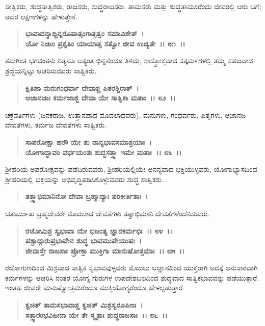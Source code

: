 ಸಾತ್ವಿಕರು, ಶುದ್ಧಸಾತ್ವಿಕರು, ರಾಜಸರು, ಶುದ್ಧರಾಜಸರು, ತಾಮಸರು ಮತ್ತು ಶುದ್ಧತಾಮಸರೆಂದು ಜೀವರಲ್ಲಿ ಆರು ಬಗೆ; ಅವರ ಲಕ್ಷಣಗಳನ್ನು ಹೇಳುತ್ತೇನೆ.

\begin{verse}
\textbf{ಭಾವಾದನ್ಯಾದ್ಭಿನ್ನರೂಪಾತ್ಸಂಗಾತ್ಸತ್ವಂ ಸಮಾವಿಶೇತ್~।}\\\textbf{ಯೋ ನಿಜಾಂ ಪ್ರಕೃತಿಂ ಯಾಯಾತ್ಸ ಸತ್ವೋ ಜೀವ ಉಚ್ಯತೇ~।। ೮೧~।।}
\end{verse}

ತಮಗಿಂತ ಭಗವಂತನು ನಿತ್ಯನೂ ಅತ್ಯಂತ ಭಿನ್ನನೆಂದೂ ತಿಳಿದು, ಶಾಸ್ತ್ರೋಕ್ತವಾದ ಸತ್ಕರ್ಮಗಳಲ್ಲಿ ತಮ್ಮ ಸಹಜವಾದ ಶ್ರದ್ಧೆಯನ್ನಿಟ್ಟು ಆಚರಿಸುವವರು ಸಾತ್ವಿಕರು.

\begin{verse}
\textbf{ಕ್ಷಿತಿಪಾ ಮನುಗಂಧರ್ವಾ ದೇವಾಶ್ಚ ಪಿತರಶ್ಚಿರಾತ್~।}\\\textbf{ಆಜಾನಜಾಃ ಕರ್ಮಜಾಶ್ಚ ದೇವಾ ಯೇ ಸಾತ್ವಿಕಾ ಮತಾಃ~।। ೮೨~।।}
\end{verse}

ಚಕ್ರವರ್ತಿಗಳು (ಜನಕರಾಜ, ಉತ್ತಾನಪಾದ ಮೊದಲಾದವರು), ಮನುಗಳು, ಗಂಧ\-ರ್ವರು, ಪಿತೃಗಳು, ಆಜಾನಜ ದೇವತೆಗಳು, ಕರ್ಮಜ ದೇವತೆಗಳು ಸಾತ್ವಿಕರು.

\begin{verse}
\textbf{ಸಾಪರೋಕ್ಷಾ ಹ‌ರೌ ಯೇ ತು ನಾನ್ಯಭಾವಸಮಾಶ್ರಯಾಃ~।}\\\textbf{ಯೋಗಾದ್ಭಾವಂ ವರ್ಧಯಂತಃ ಶುದ್ಧಸತ್ತ್ವಾ ಇಮೇ ಮತಾಃ~।। ೮೩~।।}
\end{verse}

ಶ‍್ರೀಹರಿಯ ಅಪರೋಕ್ಷವನ್ನು ಪಡೆದಿರುವವರು, ಶ‍್ರೀಹರಿಯಲ್ಲಿಯೇ ಅನನ್ಯವಾದ ಭಕ್ತಿಯುಳ್ಳವರು, ಯೋಗಾಭ್ಯಾಸದಿಂದ ಶ‍್ರೀಹರಿಯಲ್ಲಿ ಭಕ್ತಿಯನ್ನು ಅಭಿವೃದ್ಧಿಪಡಿಸಿಕೊಳ್ಳುವವರು ಶುದ್ಧ ಸಾತ್ವಿಕರು.

\begin{verse}
\textbf{ತತ್ತ್ವಾಭಿಮಾನಿನೋ ದೇವಾ ಬ್ರಹ್ಮಾದ್ಯಾಃ ಪರಿಕೀರ್ತಿತಾಃ~।}
\end{verse}

ಚತುರ್ಮುಖ ಬ್ರಹ್ಮದೇವರೇ ಮೊದಲಾದ ದೇವತೆಗಳು ತತ್ವಾಭಿಮಾನಿ ದೇವತೆಗಳೆಂದೆನಿಸುವರು.

\begin{verse}
\textbf{ರಜೋಮಿಶ್ರ ಸ್ವಭಾವಾ ಯೇ ಭಜಂತ್ಯ ಜ್ಞಾನಕರ್ಮಭಿಃ~।। ೮೪~।।}\\\textbf{ಪಶ್ಚಾದ್ಗುರುಪ್ರಭಾವೇನ ಶುದ್ಧ ಭಾವಮುಪೇಯುಷಃ~। }\\\textbf{ಜೀವಾಸ್ತೇ ರಾಜಸಾಃ ಪ್ರೋಕ್ತಾ ಮುಕ್ತಿಗಾ ಮಾನುಷೋತ್ತಮಾಃ~।। ೮೫~।।}
\end{verse}

ರಜೋಗುಣದಿಂದ ಮಿಶ್ರವಾದ ಸಾತ್ವಿಕ ಸ್ವಭಾವವುಳ್ಳವರು ಮೊದಲು ಅಜ್ಞಾನದಿಂದ ಯುಕ್ತರಾಗಿ ಅದಕ್ಕೆ ಅನುಸಾರವಾಗಿ ಕರ್ಮಗಳನ್ನು ಆಚರಿಸಿ ನಂತರ ಯೋಗ್ಯ ಗುರುಗಳ ಉಪದೇಶಬಲದಿಂದ ಶುದ್ಧವಾದ ಸಾತ್ವಿಕಭಾವವನ್ನು ಪಡೆಯುತ್ತಾರೆ. ಇಂತಹ ಜೀವರೇ ಮನುಷ್ಯೋತ್ತಮರೆಂದೂ ಮುಕ್ತಿಯೋಗ್ಯರೆಂದೂ ಹೇಳಲ್ಪಡುತ್ತಾರೆ.

\begin{verse}
\textbf{ಕ್ವಚಿತ್ ತಾಮಸಭಾವಾಶ್ಚ ಕ್ವಚಿತ್ ಮಿಶ್ರಸ್ವರೂಪಿಣಃ~।}\\\textbf{ಸತ್ತ್ವಾರಂಭವಿಹೀನಾ ಯೇ ತೇ ಸ್ಮೃತಾಃ ಶುದ್ಧರಾಜಸಾಃ~।। ೮೬~।।}
\end{verse}

